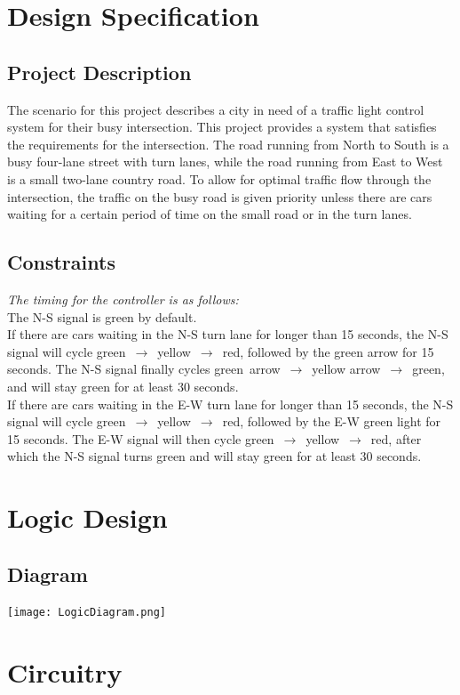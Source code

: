 \section{Design Specification}
\subsection{Project Description}
The scenario for this project describes a city in need of a traffic light control system for their busy intersection.
This project provides a system that satisfies the requirements for the intersection. The road running from North to South is a busy four-lane street with turn lanes,
while the road running from East to West is a small two-lane country road. To allow for optimal traffic flow through the intersection,
the traffic on the busy road is given priority unless there are cars waiting for a certain period of time on the small road or in the turn lanes.

\subsection{Constraints}
\emph{The timing for the controller is as follows:}\\[5mm]
The N-S signal is green by default.\\[5mm]
If there are cars waiting in the N-S turn lane for longer than 15 seconds, the N-S signal will cycle green~$\rightarrow$~yellow~$\rightarrow$~red, followed by the green arrow for 15 seconds.
The N-S signal finally cycles green~arrow~$\rightarrow$~yellow arrow~$\rightarrow$~green, and will stay green for at least 30 seconds.\\[5mm]
If there are cars waiting in the E-W turn lane for longer than 15 seconds, the N-S signal will cycle green~$\rightarrow$~yellow~$\rightarrow$~red, followed by the E-W green light for 15 seconds.
The E-W signal will then cycle green~$\rightarrow$~yellow~$\rightarrow$~red, after which the N-S signal turns green and will stay green for at least 30 seconds.
\section{Logic Design}
\subsection{Diagram}
\texttt{[image: LogicDiagram.png]}

\section{Circuitry}
